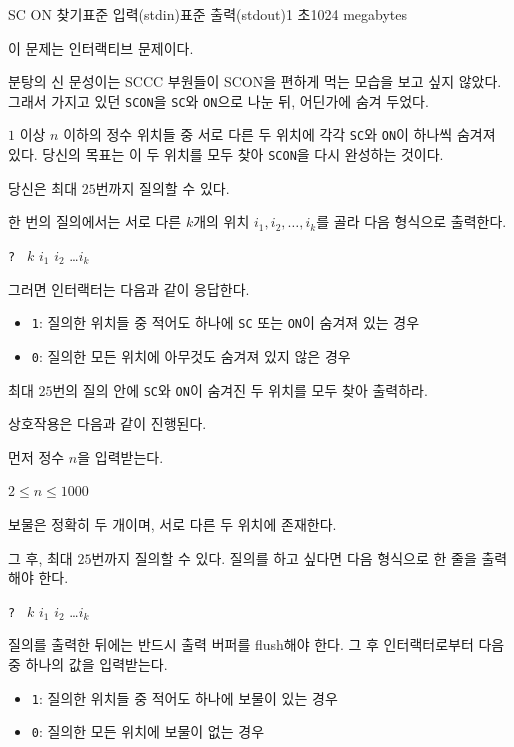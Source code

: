 \def\probtitle{SC ON 찾기}
\def\probno{PC} %

\begin{problem}{\probtitle}{표준 입력(stdin)}{표준 출력(stdout)}{1 초}{1024 megabytes}

이 문제는 인터랙티브 문제이다.

분탕의 신 문성이는 SCCC 부원들이 SCON을 편하게 먹는 모습을 보고 싶지 않았다.
그래서 가지고 있던 \texttt{SCON}을 \texttt{SC}와 \texttt{ON}으로 나눈 뒤, 어딘가에 숨겨 두었다.

$1$ 이상 $n$ 이하의 정수 위치들 중 서로 다른 두 위치에 각각 \texttt{SC}와 \texttt{ON}이 하나씩 숨겨져 있다.
당신의 목표는 이 두 위치를 모두 찾아 \texttt{SCON}을 다시 완성하는 것이다.

당신은 최대 $25$번까지 질의할 수 있다.

한 번의 질의에서는 서로 다른 $k$개의 위치
$i_1, i_2, \dots, i_k$를 골라 다음 형식으로 출력한다.
\begin{center}
\texttt{? } $k$ $i_1$ $i_2$ \dots $i_k$
\end{center}

그러면 인터랙터는 다음과 같이 응답한다.
\begin{itemize}[topsep=0pt,noitemsep]
\item \texttt{1}: 질의한 위치들 중 적어도 하나에 \texttt{SC} 또는 \texttt{ON}이 숨겨져 있는 경우
\item \texttt{0}: 질의한 모든 위치에 아무것도 숨겨져 있지 않은 경우
\end{itemize}

최대 $25$번의 질의 안에 \texttt{SC}와 \texttt{ON}이 숨겨진 두 위치를 모두 찾아 출력하라.


\Interaction
상호작용은 다음과 같이 진행된다.

먼저 정수 $n$을 입력받는다.

\begin{center}
$2 \le n \le 1000$
\end{center}

보물은 정확히 두 개이며, 서로 다른 두 위치에 존재한다.

그 후, 최대 $25$번까지 질의할 수 있다.
질의를 하고 싶다면 다음 형식으로 한 줄을 출력해야 한다.
\begin{center}
\texttt{? } $k$ $i_1$ $i_2$ \dots $i_k$
\end{center}

질의를 출력한 뒤에는 반드시 출력 버퍼를 flush해야 한다.
그 후 인터랙터로부터 다음 중 하나의 값을 입력받는다.
\begin{itemize}[topsep=0pt,noitemsep]
\item \texttt{1}: 질의한 위치들 중 적어도 하나에 보물이 있는 경우
\item \texttt{0}: 질의한 모든 위치에 보물이 없는 경우
\end{itemize}


\end{problem}
